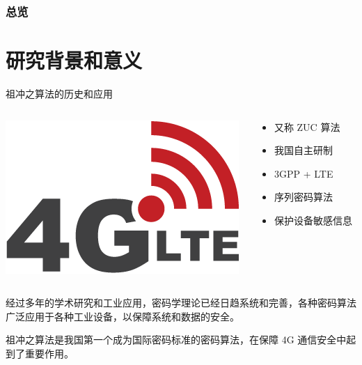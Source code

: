 \documentclass{beamer}
\begin{document}
\begin{frame}
\titlepage
\end{frame}

\begin{frame}\frametitle{总览}
\tableofcontents
\end{frame}


\section{研究背景和意义} %

\begin{frame}{祖冲之算法的历史和应用}
\begin{columns}
    \begin{column}{0.5\textwidth}
        \includegraphics[width=0.8\columnwidth]{./images/lte.png}
    \end{column}
    \begin{column}{0.5\textwidth}
    \begin{itemize}
        \item 又称 ZUC 算法
        \item 我国自主研制
        \item 3GPP + LTE
        \item 序列密码算法
        \item 保护设备敏感信息
    \end{itemize}
    \end{column}
\end{columns}

\vspace{2\baselineskip}

经过多年的学术研究和工业应用，密码学理论已经日趋系统和完善，各种密码算法广泛应用于各种工业设备，以保障系统和数据的安全。

\vspace{0.5\baselineskip}

祖冲之算法是我国第一个成为国际密码标准的密码算法，在保障 4G 通信安全中起到了重要作用。
\end{frame}
\end{document}
